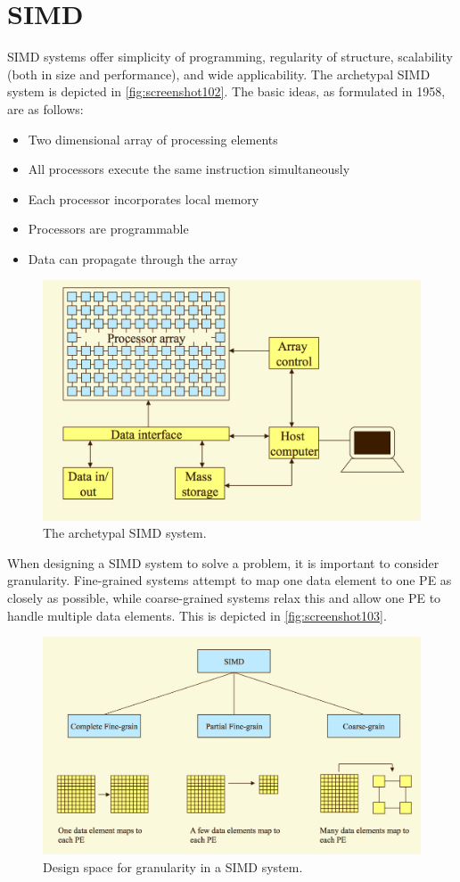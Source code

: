 \section{SIMD}
SIMD systems offer simplicity of programming, regularity of structure, scalability (both in size and performance), and wide applicability. The archetypal SIMD system is depicted in \autoref{fig:screenshot102}. The basic ideas, as formulated in 1958, are as follows: \begin{itemize}
\item Two dimensional array of processing elements 
\item All processors execute the same instruction simultaneously 
\item Each processor incorporates local memory 
\item Processors are programmable 
\item Data can propagate through the array 
\end{itemize}

\begin{figure}
\centering
\includegraphics[width=0.7\linewidth]{figures/screenshot102}
\caption{The archetypal SIMD system.}
\label{fig:screenshot102}
\end{figure}

When designing a SIMD system to solve a problem, it is important to consider granularity. Fine-grained systems attempt to map one data element to one PE as closely as possible, while coarse-grained systems relax this and allow one PE to handle multiple data elements. This is depicted in \autoref{fig:screenshot103}.

\begin{figure}
\centering
\includegraphics[width=0.7\linewidth]{figures/screenshot103}
\caption{Design space for granularity in a SIMD system.}
\label{fig:screenshot103}
\end{figure}

